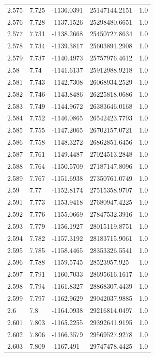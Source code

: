 \begin{tabular}{lllll}
2.575 & 7.725 & -1136.0391 & 25147144.2151 & 1.0 \\
2.576 & 7.728 & -1137.1526 & 25298480.6651 & 1.0 \\
2.577 & 7.731 & -1138.2668 & 25450727.8634 & 1.0 \\
2.578 & 7.734 & -1139.3817 & 25603891.2908 & 1.0 \\
2.579 & 7.737 & -1140.4973 & 25757976.4612 & 1.0 \\
2.58 & 7.74 & -1141.6137 & 25912988.9218 & 1.0 \\
2.581 & 7.743 & -1142.7308 & 26068934.2529 & 1.0 \\
2.582 & 7.746 & -1143.8486 & 26225818.0686 & 1.0 \\
2.583 & 7.749 & -1144.9672 & 26383646.0168 & 1.0 \\
2.584 & 7.752 & -1146.0865 & 26542423.7793 & 1.0 \\
2.585 & 7.755 & -1147.2065 & 26702157.0721 & 1.0 \\
2.586 & 7.758 & -1148.3272 & 26862851.6456 & 1.0 \\
2.587 & 7.761 & -1149.4487 & 27024513.2848 & 1.0 \\
2.588 & 7.764 & -1150.5709 & 27187147.8096 & 1.0 \\
2.589 & 7.767 & -1151.6938 & 27350761.0749 & 1.0 \\
2.59 & 7.77 & -1152.8174 & 27515358.9707 & 1.0 \\
2.591 & 7.773 & -1153.9418 & 27680947.4225 & 1.0 \\
2.592 & 7.776 & -1155.0669 & 27847532.3916 & 1.0 \\
2.593 & 7.779 & -1156.1927 & 28015119.8751 & 1.0 \\
2.594 & 7.782 & -1157.3192 & 28183715.9061 & 1.0 \\
2.595 & 7.785 & -1158.4465 & 28353326.5541 & 1.0 \\
2.596 & 7.788 & -1159.5745 & 28523957.925 & 1.0 \\
2.597 & 7.791 & -1160.7033 & 28695616.1617 & 1.0 \\
2.598 & 7.794 & -1161.8327 & 28868307.4439 & 1.0 \\
2.599 & 7.797 & -1162.9629 & 29042037.9885 & 1.0 \\
2.6 & 7.8 & -1164.0938 & 29216814.0497 & 1.0 \\
2.601 & 7.803 & -1165.2255 & 29392641.9195 & 1.0 \\
2.602 & 7.806 & -1166.3579 & 29569527.9278 & 1.0 \\
2.603 & 7.809 & -1167.491 & 29747478.4425 & 1.0 \\

\end{tabular}
